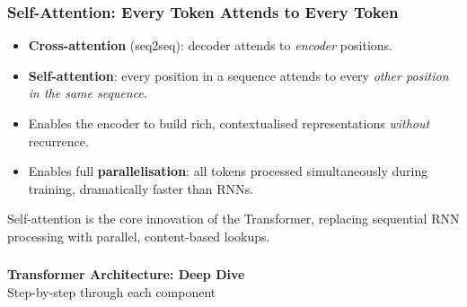 





\begin{frame}[fragile]\frametitle{Self-Attention: Every Token Attends to Every Token}
\begin{itemize}
\item \textbf{Cross-attention} (seq2seq): decoder attends to \emph{encoder} positions.
\item \textbf{Self-attention}: every position in a sequence attends to every \emph{other position in the same sequence}.
\item Enables the encoder to build rich, contextualised representations \emph{without} recurrence.
\item Enables full \textbf{parallelisation}: all tokens processed simultaneously during training,  dramatically faster than RNNs.
\end{itemize}
\vspace{0.5em}
Self-attention is the core innovation of the Transformer, replacing sequential RNN processing with parallel, content-based lookups.
\end{frame}




\begin{frame}[fragile]\frametitle{}
\begin{center}
{\Large \textbf{Transformer Architecture: Deep Dive}}\\[0.5em]
{\normalsize Step-by-step through each component}
\end{center}
\end{frame}


